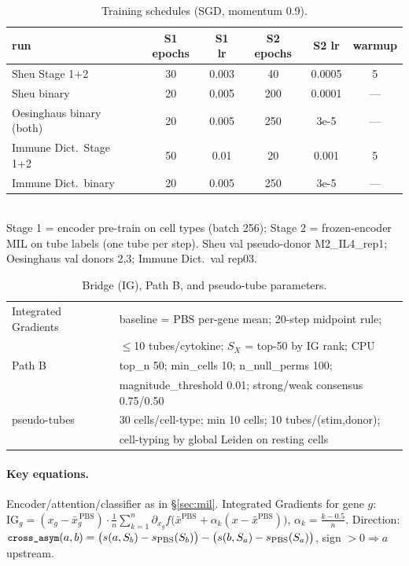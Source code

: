 \documentclass[11pt]{article}
\newcommand{\code}[1]{\texttt{\small #1}}
\newcommand{\cross}{\code{cross\_asym}}
\newcommand{\Sx}{\ensuremath{S_X}}
\begin{document}
\begin{table}[h]\centering\small
\caption{Training schedules (SGD, momentum 0.9).}\label{tab:sched}
\begin{tabular}{@{}lccccc@{}}
\toprule
run & S1 epochs & S1 lr & S2 epochs & S2 lr & warmup \\
\midrule
Sheu Stage 1+2 & 30 & 0.003 & 40  & 0.0005  & 5 \\
Sheu binary    & 20 & 0.005 & 200 & 0.0001  & --- \\
Oesinghaus binary (both) & 20 & 0.005 & 250 & 3e-5 & --- \\
Immune Dict.\ Stage 1+2  & 50 & 0.01  & 20  & 0.001 & 5 \\
Immune Dict.\ binary     & 20 & 0.005 & 250 & 3e-5  & --- \\
\bottomrule
\end{tabular}\\[2pt]
{\scriptsize Stage 1 = encoder pre-train on cell types (batch 256); Stage 2 =
frozen-encoder MIL on tube labels (one tube per step). Sheu val pseudo-donor
M2\_IL4\_rep1; Oesinghaus val donors 2,3; Immune Dict.\ val rep03.}
\end{table}

\begin{table}[h]\centering\small
\caption{Bridge (IG), Path B, and pseudo-tube parameters.}\label{tab:params}
\begin{tabular}{@{}ll@{}}
\toprule
Integrated Gradients & baseline = PBS per-gene mean; 20-step midpoint rule;\\
 & $\le$10 tubes/cytokine; \Sx{} = top-50 by IG rank; CPU \\
Path B               & top\_n 50; min\_cells 10; n\_null\_perms 100; \\
 & magnitude\_threshold 0.01; strong/weak consensus 0.75/0.50 \\
pseudo-tubes         & 30 cells/cell-type; min 10 cells; 10 tubes/(stim,donor); \\
 & cell-typing by global Leiden on resting cells \\
\bottomrule
\end{tabular}
\end{table}

\paragraph{Key equations.} Encoder/attention/classifier as in §\ref{sec:mil}.
Integrated Gradients for gene $g$:
$\mathrm{IG}_g=(x_g-\bar x^{\,\text{PBS}}_g)\cdot\frac1n\sum_{k=1}^{n}
\partial_{x_g}f\big(\bar x^{\text{PBS}}+\alpha_k(x-\bar x^{\text{PBS}})\big)$,
$\alpha_k=\tfrac{k-0.5}{n}$. Direction:
$\cross(a,b)=\big(s(a,S_b)-s_{\text{PBS}}(S_b)\big)-\big(s(b,S_a)-s_{\text{PBS}}(S_a)\big)$,
sign $>0\Rightarrow a$ upstream.
\end{document}
